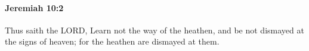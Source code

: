 
		\paragraph{Jeremiah 10:2} %
			\label{JEREMIAH-10-2}

			Thus saith the LORD, Learn not the way of the heathen, and be not dismayed at the signs of heaven; for the heathen are dismayed at them.



